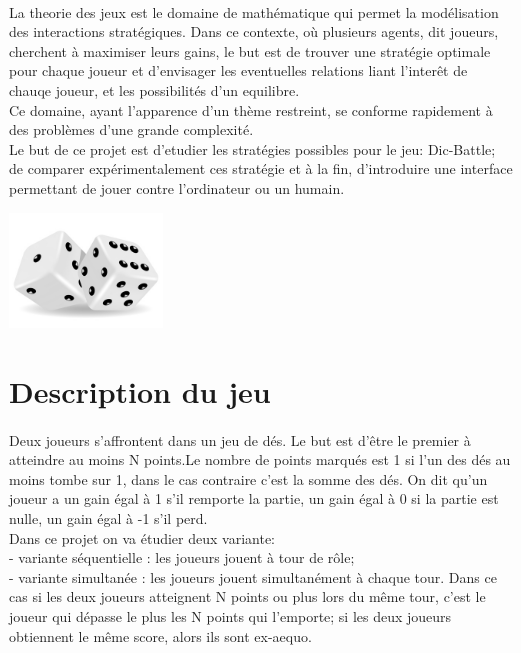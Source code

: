 \documentclass{article}
\begin{document}
\paragraph{}
    \begin{Large}
        La theorie des jeux est le domaine de mathématique qui permet la modélisation des interactions stratégiques. 
        Dans ce contexte, où plusieurs agents, dit joueurs, cherchent à maximiser leurs gains, le but est de trouver
        une stratégie optimale pour chaque joueur et d'envisager les eventuelles relations liant l'interêt de chauqe 
        joueur, et les possibilités d'un equilibre.\\
        Ce domaine, ayant l'apparence d'un thème restreint, se conforme rapidement à des problèmes d'une grande complexité.\\
        Le but de ce projet est d'etudier les stratégies possibles pour le jeu: Dic-Battle; de comparer expérimentalement ces stratégie
        et à la fin, d'introduire une interface permettant de jouer contre l'ordinateur ou un humain.\\[3.5cm]
        \begin{center}
        \includegraphics[width=11em]{de.jpg}\\[30cm]
        \end{center}
    \end{Large}
\newpage

\section{Description du jeu}
\paragraph{}
    \begin{large}
        Deux joueurs s'affrontent dans un jeu de dés. Le but est d'être le premier à atteindre au moins
        N points.Le nombre de points marqués est 1 si l'un des dés au moins tombe sur 1,
        dans le cas contraire c'est la somme des dés. On dit qu'un joueur a un gain égal à 1 s'il remporte la partie, un gain égal
        à 0 si la partie est nulle, un gain égal à -1 s'il perd.\\
        Dans ce projet on va étudier deux variante:\\
        - variante séquentielle : les joueurs jouent à tour de rôle;\\
        - variante simultanée : les joueurs jouent simultanément à chaque tour. Dans ce cas si les
        deux joueurs atteignent N points ou plus lors du même tour, c'est le joueur qui dépasse le
        plus les N points qui l'emporte; si les deux joueurs obtiennent le même score, alors ils sont
        ex-aequo.
    \end{large}
\end{document}
